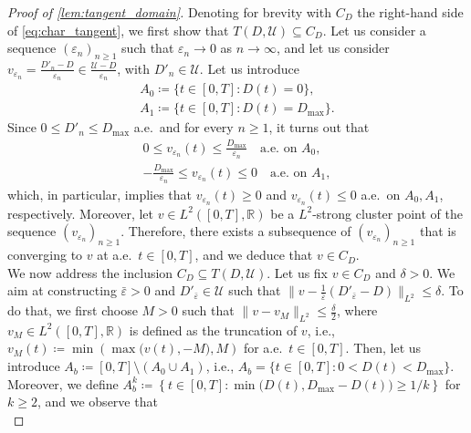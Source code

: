 \documentclass[a4paper,12pt, reqno]{amsart}
\theoremstyle{plain}
\theoremstyle{definition}
\theoremstyle{remark}
\numberwithin{equation}{section}
\newcommand{\R}{\mathbb{R}}
\newcommand{\U}{\mathcal{U}}
\newcommand{\e}{\varepsilon}
\begin{document}
\begin{appendix}
\begin{proof}[Proof of \cref{lem:tangent_domain}]
    Denoting for brevity with $C_{D}$ the right-hand side of \cref{eq:char_tangent}, we first show that $T({D},\U)\subseteq C_{D}$.
    Let us consider a sequence $(\e_n)_{n\geq 1}$ such that $\e_n\to 0$ as $n\to\infty$, and let us consider $v_{\e_n} =\frac{{D}'_n- {D}}{\e_n} \in \frac{\U- {D}}{\e_n}$, with ${D}'_n\in\U$. Let us introduce
    \begin{equation} \label{eq:instant_0_1}
        \begin{split}
            A_0\coloneqq \{t\in[0,T] : {D}(t)=0\}, \\
            A_1\coloneqq \{t\in[0,T] : {D}(t)={D_{\max}}\}.
        \end{split}
    \end{equation}
    Since $0\leq {D}'_n\leq {D_{\max}}$ a.e.~and for every $n\geq 1$, it turns out that
    \begin{equation*}
        \begin{split}
            0\leq v_{\e_n}(t)\leq \frac{{D_{\max}}}{\e_n} \quad \mbox{a.e. on } A_0,\\
            -\frac{{D_{\max}}}{\e_n} \leq v_{\e_n}(t)\leq  0 \quad \mbox{a.e. on } A_1,
        \end{split}
    \end{equation*}
    which, in particular, implies that $v_{\e_n}(t)\geq 0$ and $v_{\e_n}(t)\leq 0$ a.e.~on $A_0,A_1$, respectively.
    Moreover, let $v \in L^2([0,T],\R)$ be a $L^2$-strong cluster point of the sequence $(v_{\e_n})_{n\geq 1}$. Therefore, there exists a subsequence of $(v_{\e_n})_{n\geq 1}$ that is converging to $v$ at a.e.~$t \in [0,T]$, and we deduce that $v \in C_{D}$.\\
    We now address the inclusion $C_{D} \subseteq T({D},\U)$. Let us fix $v\in C_{D}$ and $\delta>0$. We aim at constructing $\bar \e>0$ and ${D}'_{\bar \e}\in \U$ such that $\| v- \frac1{\bar \e}({D}'_{\bar \e} - {D} )\|_{L^2}\leq \delta$.
    To do that, we first choose $M>0$ such that $\| v- v_M\|_{L^2}\leq \frac\delta2$, where $v_M\in L^2([0,T],\R)$ is defined as the truncation of $v$, i.e., $v_M(t)\coloneqq \min\left( \max\big( v(t), -M \big),M \right)$ for a.e.~$t\in [0,T]$.
    Then, let us introduce $A_b\coloneqq [0,T]\setminus (A_0 \cup A_1)$, i.e., $A_b= \{ t\in[0,T]: 0<{D}(t)<{D_{\max}} \}$.
    Moreover, we define $A_b^k \coloneqq \left\{ t\in[0,T]: \min\big( {D}(t),{D_{\max}}-{D}(t) \big) \geq 1/k \right\}$ for $k\geq 2$, and we observe that 
    \begin{equation*}

\end{equation*}
\end{proof}
\end{appendix}
\end{document}
